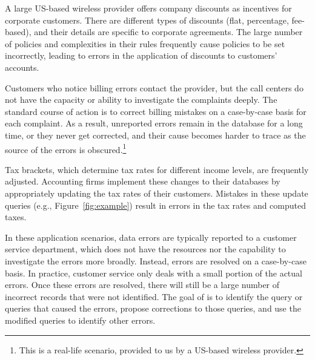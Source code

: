 \begin{example}\label{ex:telco}

A large US-based wireless provider offers company discounts as incentives for
corporate customers. There are different types of discounts (flat, percentage,
fee-based), and their details are specific to corporate agreements. The large
number of policies and complexities in their rules frequently cause policies
to be set incorrectly, leading to errors in the application of discounts to
customers' accounts.

Customers who notice billing errors contact the provider, but the call centers
do not have the capacity or ability to investigate the complaints deeply. The
standard course of action is to correct billing mistakes on a case-by-case
basis for each complaint. As a result, unreported errors remain in the
database for a long time, or they never get corrected, and their cause becomes
harder to trace as the source of the errors is obscured.\footnote{This is a real-life scenario, provided to us by a US-based wireless provider. }

\end{example}

\begin{example}\label{ex:taxes}
    
Tax brackets, which determine tax rates for different income levels, are
frequently adjusted. Accounting firms implement these changes to their
databases by appropriately updating the tax rates of their customers. Mistakes
in these update queries (e.g., Figure~\ref{fig:example}) result in errors in
the tax rates and computed taxes. 

\end{example}


In these application scenarios, data errors are typically reported to a
customer service department, which does not have the resources nor the
capability to investigate the errors more broadly. Instead, errors are
resolved on a case-by-case basis. In practice, customer service only deals
with a small portion of the actual errors. Once these errors are resolved,
there will still be a large number of incorrect records that were not
identified. The goal of \sys is to identify the query or queries that caused
the errors, propose corrections to those queries, and use the modified queries
to identify other errors.

